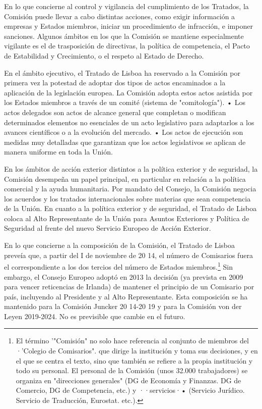 \documentclass[10pt,a4paper]{article}
\begin{document}
En lo que concierne al control y vigilancia del cumplimiento de los Tratados, la Comisión puede llevar a cabo distintas acciones, como exigir información a empresas y Estados miembros, iniciar un procedimiento de infracción, e imponer sanciones. Algunos ámbitos en los que la Comisión se mantiene especialmente vigilante es el de trasposición de directivas, la política de competencia, el Pacto de Estabilidad y Crecimiento, o el respeto al Estado de Derecho. 

En el ámbito ejecutivo, el Tratado de Lisboa ha reservado a la Comisión por primera vez la potestad de adoptar dos tipos de actos encaminados a la aplicación de la legislación europea. La Comisión adopta estos actos asistida por los Estados miembros a través de un comité (sistema de "comitología"). 
• Los actos delegados son actos de alcance general que completan o modifican determinados elementos no esenciales de un acto legislativo para adaptarlos a los avances científicos o a la evolución del mercado. 
• Los actos de ejecución son medidas muy detalladas que garantizan que los actos legislativos se aplican de manera uniforme en toda la Unión.

En los ámbitos de acción exterior distintos a la política exterior y de seguridad, la Comisión desempeña un papel principal, en particular en relación a la política comercial y la ayuda humanitaria. Por mandato del Consejo, la Comisión negocia los acuerdos y los tratados internacionales sobre materias que sean competencia de la Unión. En cuanto a la política exterior y de seguridad, el Tratado de Lisboa coloca al  Alto Representante de la Unión para Asuntos Exteriores y Política de Seguridad al frente del nuevo Servicio Europeo de Acción Exterior.

En lo que concierne a la composición de la Comisión, el Tratado de Lisboa preveía que, a partir del I de noviembre de 20 14, el número de Comisarios fuera el correspondiente a los dos tercios del número de Estados miembros.\footnote{%
    El término '"Comisión" no solo hace referencia al conjunto de miembros del ·'Colegio de Comisarios". que dirige la institución y toma sus decisiones, y en el que se centra el texto, sino que también se refiere a la propia institución y todo su personal. El personal de la Comisión (unos 32.000 trabajadores) se organiza en "direcciones generales" (DG de Economía y Finanzas. DG de Comercio, DG de Competencia, etc.) y ··servicios·• (Servicio Jurídico. Servicio de Traducción, Eurostat. etc.).
} Sin embargo, el Consejo Europeo adoptó en 2013 la decisión (ya prevista en 2009 para vencer reticencias de Irlanda) de mantener el principio de un Comisario por país, incluyendo al Presidente y al Alto Representante. Esta composición se ha mantenido para la Comisión Juncker 20 14-20 19 y para la Comisión von der Leyen 2019-2024. No es previsible que cambie en el futuro.
\end{document}
